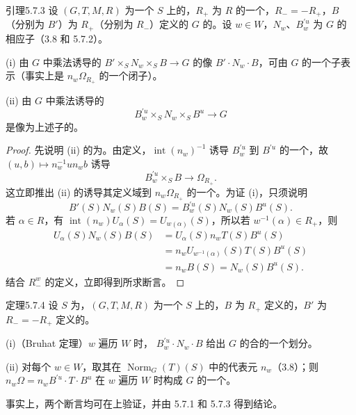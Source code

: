 \begin{SGAresult}{引理}{5.7.3}
设 $(G,T,M,R)$ 为一个 $S$ 上的，$R_+$ 为 $R$ 的一个，$R_-=-R_+$，$B$（分别为 $B'$）为 $R_+$（分别为 $R_-$）定义的 $G$ 的。设 $w\in W$，$N_w$、$B_w^{\prime u}$ 为 $G$ 的相应子（3.8 和 5.7.2）。

(i) 由 $G$ 中乘法诱导的 $B'\times_SN_w\times_SB\to G$ 的像 $B'\cdot N_w\cdot B$，可由 $G$ 的一个子表示（事实上是 $n_w\Omega_{R_+}$ 的一个闭子）。

(ii) 由 $G$ 中乘法诱导的
\[B_w^{\prime u}\times_SN_w\times_SB^u\longrightarrow G\]
是像为上述子的。
\end{SGAresult}
\begin{proof}
先说明 (ii) 的为。由定义，$\operatorname{int}(n_w)^{-1}$ 诱导 $B_w^{\prime u}$ 到 $B^{\prime u}$ 的一个，故 $(u,b)\mapsto n_w^{-1}un_wb$ 诱导
\[B_w^{\prime u}\times_SB\longrightarrow\Omega_{R_+}.\]
这立即推出 (ii) 的诱导其定义域到 $n_w\Omega_{R_+}$ 的一个。为证 (i)，只须说明
\[B'(S)N_w(S)B(S)=B_w^{\prime u}(S)N_w(S)B^u(S).\]
若 $\alpha\in R$，有 $\operatorname{int}(n_w)U_\alpha(S)=U_{w(\alpha)}(S)$，所以若 $w^{-1}(\alpha)\in R_+$，则
\[\begin{split}
U_\alpha(S)N_w(S)B(S)&=U_\alpha(S)n_wT(S)B^u(S)\\
&=n_wU_{w^{-1}(\alpha)}(S)T(S)B^u(S)\\
&=n_wB(S)=N_w(S)B^u(S).
\end{split}\]
结合 $R_-^w$ 的定义，立即得到所求断言。
\end{proof}
\begin{SGAresult}{定理}{5.7.4}
设 $S$ 为，$(G,T,M,R)$ 为一个 $S$ 上的，$B$ 为 $R_+$ 定义的，$B'$ 为 $R_-=-R_+$ 定义的。

(i)（Bruhat 定理）$w$ 遍历 $W$ 时， $B_w^{\prime u}\cdot N_w\cdot B$ 给出 $G$ 的合的一个划分。

(ii) 对每个 $w\in W$，取其在 $\operatorname{Norm}_G(T)(S)$ 中的代表元 $n_w$（3.8）；则 $n_w\Omega=n_wB^{\prime u}\cdot T\cdot B^u$ 在 $w$ 遍历 $W$ 时构成 $G$ 的一个。
\end{SGAresult}
事实上，两个断言均可在上验证，并由 5.7.1 和 5.7.3 得到结论。

